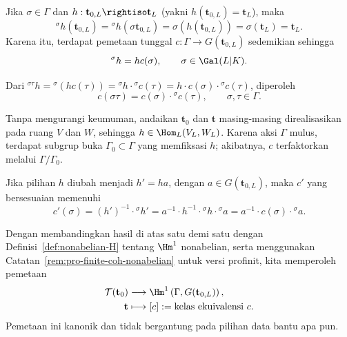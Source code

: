 Jika $\sigma\in\Gamma$ dan
$h:\mathbf{t}_{0,L}\rightiso\mathbf{t}_L$ (yakni
$h(\mathbf{t}_{0,L})=\mathbf{t}_L$), maka
\[
{}^\sigma h(\mathbf{t}_{0,L})
={}^\sigma h(\sigma\mathbf{t}_{0,L})
=\sigma(h(\mathbf{t}_{0,L}))
=\sigma(\mathbf{t}_L)
=\mathbf{t}_L.
\]
Karena itu, terdapat pemetaan tunggal
$c:\Gamma\to G(\mathbf{t}_{0,L})$ sedemikian sehingga
\[
{}^\sigma h=hc(\sigma),\qquad \sigma\in\Gal(L|K).
\]

Dari
${}^{\sigma\tau}h={}^\sigma(hc(\tau))={}^\sigma h\cdot
{}^\sigma c(\tau)=h\cdot c(\sigma)\cdot{}^\sigma c(\tau)$, diperoleh
\[
c(\sigma\tau)=c(\sigma)\cdot{}^\sigma c(\tau),
\qquad \sigma,\tau\in\Gamma.
\]

Tanpa mengurangi keumuman, andaikan $\mathbf{t}_0$ dan $\mathbf{t}$
masing-masing direalisasikan pada ruang $V$ dan $W$, sehingga
$h\in\Hom_L(V_L,W_L)$. Karena aksi $\Gamma$ mulus, terdapat subgrup buka
$\Gamma_0\subset\Gamma$ yang memfiksasi $h$; akibatnya, $c$ terfaktorkan
melalui $\Gamma/\Gamma_0$.

Jika pilihan $h$ diubah menjadi $h'=ha$, dengan
$a\in G(\mathbf{t}_{0,L})$, maka $c'$ yang bersesuaian memenuhi
\[
c'(\sigma)=(h')^{-1}\cdot{}^\sigma h'
=a^{-1}\cdot h^{-1}\cdot{}^\sigma h\cdot{}^\sigma a
=a^{-1}\cdot c(\sigma)\cdot{}^\sigma a.
\]

Dengan membandingkan hasil di atas satu demi satu dengan
Definisi~\ref{def:nonabelian-H} tentang $\Hm^1$ nonabelian, serta menggunakan
Catatan~\ref{rem:pro-finite-coh-nonabelian} untuk versi profinit, kita
memperoleh pemetaan
\begin{equation}\label{eqn:Galois-H1-prep}
	\begin{aligned}
		\mathcal{T}(\mathbf{t}_0)&\longrightarrow
		\Hm^1\left(\Gamma,G(\mathbf{t}_{0,L})\right),\\
		\mathbf{t}&\longmapsto[c]:=\text{kelas ekuivalensi }c.
	\end{aligned}
\end{equation}
Pemetaan ini kanonik dan tidak bergantung pada pilihan data bantu apa pun.

